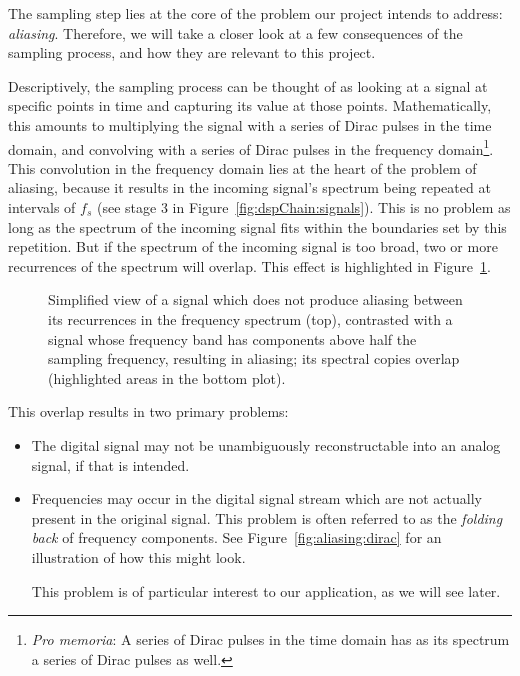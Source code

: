The sampling  step lies  at the  core of  the problem  our project  intends to
address:  \emph{aliasing}. Therefore, we  will take  a  closer look  at a  few
consequences  of the  sampling  process, and  how they  are  relevant to  this
project.

Descriptively,  the  sampling process  can  be  thought  of  as looking  at  a
signal  at  specific  points  in  time   and  capturing  its  value  at  those
points. Mathematically, this amounts  to multiplying the signal  with a series
of Dirac  pulses in  the time domain,  and convolving with  a series  of Dirac
pulses in the frequency domain\footnote{%
    \emph{Pro memoria}: A series of Dirac pulses  in the time domain has as its
    spectrum a series of Dirac pulses as well.%
}.
This convolution in the  frequency domain lies at the heart  of the problem of
aliasing, because it results in  the incoming signal's spectrum being repeated
at intervals of $f_s$ (see stage 3 in Figure~\ref{fig:dspChain:signals}). This
is no problem as  long as the spectrum of the incoming  signal fits within the
boundaries set by this repetition. But if  the spectrum of the incoming signal
is  too broad,  two or  more recurrences  of the  spectrum will  overlap. This
effect is highlighted in Figure~\ref{fig:aliasing:band}.

\begin{figure}
    \centering
    
    \caption[Aliasing Illustrated via Signal Frequency Band]{%
        Simplified view  of a signal  which does not produce  aliasing between
        its recurrences  in the  frequency spectrum  (top), contrasted  with a
        signal whose  frequency band  has components  above half  the sampling
        frequency,  resulting   in  aliasing;  its  spectral   copies  overlap
        (highlighted areas in the bottom plot).%
    }
    \label{fig:aliasing:band}
\end{figure}

This overlap results in two primary problems:
\begin{itemize}\tightlist
    \item
        The digital  signal may not  be unambiguously reconstructable  into an
        analog signal, if that is intended.
    \item
        Frequencies  may occur  in the  digital  signal stream  which are  not
        actually  present  in  the  original  signal. This  problem  is  often
        referred to  as the  \emph{folding back} of  frequency components. See
        Figure~\ref{fig:aliasing:dirac} for an illustration  of how this might
        look.

        This problem is of particular interest  to our application, as we will
        see later.
\end{itemize}

